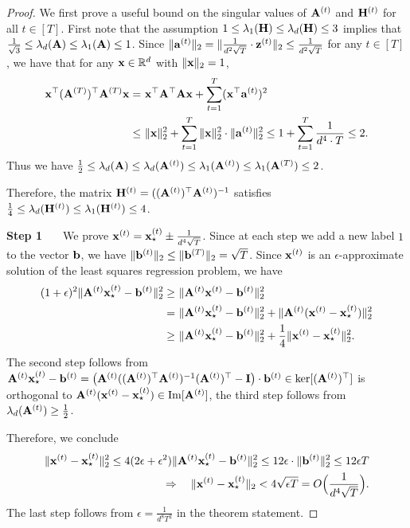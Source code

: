 \begin{proof}
We first prove a useful bound on the singular values of $\mathbf{A}^{(t)}$ and $\mathbf{H}^{(t)}$ for all $t \in [T]$.
First note that the assumption $1\leq \lambda_1(\mathbf{H}) \leq \lambda_{d}(\mathbf{H}) \leq 3$ implies that $\frac{1}{\sqrt{3}} \leq \lambda_d(\mathbf{A}) \leq \lambda_1(\mathbf{A}) \leq 1$.
Since $\|\mathbf{a}^{(t)}\|_2 = \|\frac{1}{d^2\sqrt{T}}\cdot \mathbf{z}^{(t)}\|_2 \leq \frac{1}{d^2\sqrt{T}}$ for any $t\in [T]$, we have that for any $\mathbf{x} \in \mathbb{R}^d$ with $\|\mathbf{x}\|_2 = 1$,
\begin{align*}
    \mathbf{x}^{\top} (\mathbf{A}^{(T)})^{\top} \mathbf{A}^{(T)} \mathbf{x} = &~ \mathbf{x}^{\top} \mathbf{A}^{\top} \mathbf{A} \mathbf{x} + \sum_{t=1}^T (\mathbf{x}^{\top} \mathbf{a}^{(t)})^2 \\
    \leq &~ \|\mathbf{x}\|_2^2 + \sum_{t=1}^T \|\mathbf{x}\|_2^2\cdot \|\mathbf{a}^{(t)}\|_2^2 \leq 1 + \sum_{t=1}^T \frac{1}{d^4 \cdot T} \leq 2.
\end{align*}
Thus we have $\frac{1}{2} \leq \lambda_d(\mathbf{A}) \leq \lambda_d(\mathbf{A}^{(t)}) \leq \lambda_1(\mathbf{A}^{(t)}) \leq \lambda_1(\mathbf{A}^{(T)}) \leq 2$.

Therefore, the matrix $\mathbf{H}^{(t)} = ((\mathbf{A}^{(t)})^{\top} \mathbf{A}^{(t)})^{-1}$ satisfies $\frac{1}{4} \leq \lambda_d(\mathbf{H}^{(t)}) \leq \lambda_1(\mathbf{H}^{(t)}) \leq 4$.
 


\vspace{+2mm}
{\noindent \bf Step 1 \ \ } We prove $\mathbf{x}^{(t)} = \mathbf{x}_{\star}^{(t)} \pm \frac{1}{d^4\sqrt{T}}$. Since at each step we add a new label $1$ to the vector $\mathbf{b}$, we have $\|\mathbf{b}^{(t)}\|_2 \leq \|\mathbf{b}^{(T)}\|_2 = \sqrt{T}$.
Since $\mathbf{x}^{(t)}$ is an $\epsilon$-approximate solution of the least squares regression problem, we have
\begin{align*}
(1+\epsilon)^2\|\mathbf{A}^{(t)} \mathbf{x}_{\star}^{(t)} - \mathbf{b}^{(t)}\|_2^2 \geq &~ \|\mathbf{A}^{(t)} \mathbf{x}^{(t)} - \mathbf{b}^{(t)}\|_2^2\\
=&~ \|\mathbf{A}^{(t)} \mathbf{x}_{\star}^{(t)} - \mathbf{b}^{(t)}\|_2^2 + \|\mathbf{A}^{(t)}(\mathbf{x}^{(t)} - \mathbf{x}_{\star}^{(t)})\|_2^2\\
\geq&~ \|\mathbf{A}^{(t)} \mathbf{x}_{\star}^{(t)} - \mathbf{b}^{(t)}\|_2^2 + \frac{1}{4}\|\mathbf{x}^{(t)} -\mathbf{x}_{\star}^{(t)}\|_2^2.
\end{align*}
The second step follows from $\mathbf{A}^{(t)} \mathbf{x}_{\star}^{(t)} - \mathbf{b}^{(t)} = \big( \mathbf{A}^{(t)} ((\mathbf{A}^{(t)})^{\top} \mathbf{A}^{(t)})^{-1} (\mathbf{A}^{(t)})^{\top} - \mathbf{I} \big) \cdot \mathbf{b}^{(t)} \in \ker[(\mathbf{A}^{(t)})^{\top}]$ is orthogonal to $\mathbf{A}^{(t)}(\mathbf{x}^{(t)} - \mathbf{x}_{\star}^{(t)}) \in \operatorname{Im}[\mathbf{A}^{(t)}]$, the third step follows from $\lambda_d(\mathbf{A}^{(t)}) \geq \frac{1}{2}$.

Therefore, we conclude
\begin{align}
    \|\mathbf{x}^{(t)} -\mathbf{x}_{\star}^{(t)}\|_2^2 \leq 4(2\epsilon + \epsilon^2)\|\mathbf{A}^{(t)} \mathbf{x}_{\star}^{(t)} - \mathbf{b}^{(t)}\|_2^2 \leq 12\epsilon \cdot \|\mathbf{b}^{(t)}\|_2^2 \leq 12\epsilon T \notag\\
    \Rightarrow \quad \|\mathbf{x}^{(t)} -\mathbf{x}_{\star}^{(t)}\|_2 < 4\sqrt{\epsilon T} = O\Big(\frac{1}{d^4\sqrt{T}}\Big)\label{eq:lower-step1}.
\end{align}
The last step follows from $\epsilon = \frac{1}{d^8 T^2}$ in the theorem statement.


\end{proof}
